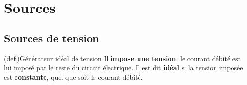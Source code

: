 \documentclass[../../main/main.tex]{subfiles}
\begin{document}
\section{Sources}
\subsection{Sources de tension}

\begin{tcb}[label=def:gentens, sidebyside, righthand ratio=.2](defi){Générateur
			idéal de tension}
	Il \textbf{impose une tension}, le courant débité est lui imposé par le reste
	du circuit électrique. Il est dit \textbf{idéal} si la tension imposée est
	\textbf{constante}, quel que soit le courant débité.
	\tcblower
	\vspace{-10pt}
	\begin{center}
		\vspace{-10pt}
	\end{center}
\end{tcb}
\end{document}
